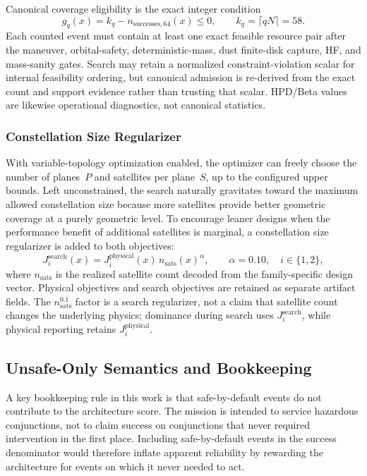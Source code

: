     Canonical coverage eligibility is the exact integer condition
    \begin{equation}
        g_q(x)=k_q-n_{\mathrm{successes},64}(x)\le0,
        \qquad k_q=\lceil qN\rceil=58.
    \end{equation}
    Each counted event must contain at least one exact feasible resource pair after the maneuver, orbital-safety, deterministic-mass, dust finite-disk capture, HF, and mass-sanity gates. Search may retain a normalized constraint-violation scalar for internal feasibility ordering, but canonical admission is re-derived from the exact count and support evidence rather than trusting that scalar. HPD/Beta values are likewise operational diagnostics, not canonical statistics.

    \subsubsection{Constellation Size Regularizer}
    With variable-topology optimization enabled, the optimizer can freely choose the number of planes~\(P\) and satellites per plane~\(S\), up to the configured upper bounds. Left unconstrained, the search naturally gravitates toward the maximum allowed constellation size because more satellites provide better geometric coverage at a purely geometric level. To encourage leaner designs when the performance benefit of additional satellites is marginal, a constellation size regularizer is added to both objectives:
    \begin{equation}
        J_i^{\mathrm{search}}(x)
        = J_i^{\mathrm{physical}}(x)\,n_{\mathrm{sats}}(x)^{\alpha},
        \qquad \alpha=0.10,\quad i\in\{1,2\},
        \label{eq:size_penalty}
    \end{equation}
    where \(n_{\mathrm{sats}}\) is the realized satellite count decoded from the family-specific design vector. Physical objectives and search objectives are retained as separate artifact fields. The \(n_{\mathrm{sats}}^{0.1}\) factor is a search regularizer, not a claim that satellite count changes the underlying physics; dominance during search uses \(J_i^{\mathrm{search}}\), while physical reporting retains \(J_i^{\mathrm{physical}}\).

    \subsection{Unsafe-Only Semantics and Bookkeeping}
    A key bookkeeping rule in this work is that safe-by-default events do not contribute to the architecture score. The mission is intended to service hazardous conjunctions, not to claim success on conjunctions that never required intervention in the first place. Including safe-by-default events in the success denominator would therefore inflate apparent reliability by rewarding the architecture for events on which it never needed to act.

